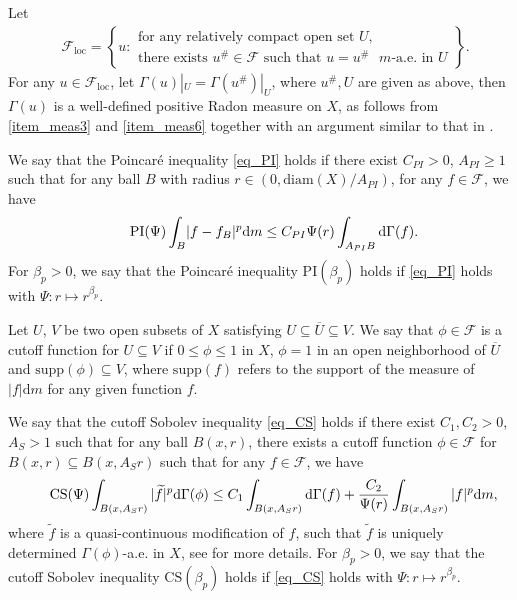 \documentclass[11pt,a4paper]{article}
\numberwithin{equation}{section}
\theoremstyle{plain}
\theoremstyle{definition}
\begin{document}
Let
\begin{align*}
&\mathcal{F}_{\mathrm{loc}}=\left\{u:
\begin{array}{l}
\text{for any relatively compact open set }U,\\
\text{there exists }u^\#\in\mathcal{F}\text{ such that }u=u^\#\text{ }m\text{-a.e. in }U
\end{array}
\right\}.
\end{align*}
For any $u\in \mathcal{F}_{\mathrm{loc}}$, let $\Gamma(u)|_U=\Gamma(u^\#)|_U$, where $u^\#, U$ are given as above, then $\Gamma(u)$ is a well-defined positive Radon measure on $X$, as follows from \ref{item_meas3} and \ref{item_meas6} together with an argument similar to that in \cite[Corollary 3.2.1]{FOT11}.

We say that the Poincar\'e inequality \ref{eq_PI} holds if there exist $C_{PI}>0$, $A_{PI}\ge1$ such that for any ball $B$ with radius $r\in(0,\mathrm{diam}(X)/A_{PI})$, for any $f\in\mathcal{F}$, we have
\begin{equation*}\label{eq_PI}\tag*{$\text{PI}(\Psi)$}
\int_B\lvert f-f_B\rvert^p\mathrm{d} m\le C_{PI}\Psi(r)\int_{A_{PI}B}\mathrm{d}\Gamma(f).
\end{equation*}
For $\beta_p>0$, we say that the Poincar\'e inequality \hypertarget{eq_PIbeta}{$\text{PI}(\beta_p)$} holds if \ref{eq_PI} holds with $\Psi:r\mapsto r^{\beta_p}$.

Let $U$, $V$ be two open subsets of $X$ satisfying $U\subseteq\overline{U}\subseteq V$. We say that $\phi\in\mathcal{F}$ is a cutoff function for $U\subseteq V$ if $0\le\phi\le1$ in $X$, $\phi=1$ in an open neighborhood of $\overline{U}$ and $\mathrm{supp}(\phi)\subseteq V$, where $\mathrm{supp}(f)$ refers to the support of the measure of $|f|\mathrm{d} m$ for any given function $f$.

We say that the cutoff Sobolev inequality \ref{eq_CS} holds if there exist $C_{1}, C_{2}>0$, $A_{S}>1$ such that for any ball $B(x,r)$, there exists a cutoff function $\phi\in\mathcal{F}$ for $B(x,r)\subseteq B(x,A_Sr)$ such that for any $f\in\mathcal{F}$, we have
\begin{equation*}\label{eq_CS}\tag*{$\text{CS}(\Psi)$}
\int_{B(x,A_{S}r)}|\widetilde{f}|^p \mathrm{d}\Gamma(\phi)\le C_{1}\int_{B(x,A_{S}r)}\mathrm{d}\Gamma(f)+\frac{C_{2}}{\Psi(r)}\int_{B(x,A_{S}r)}|f|^p\mathrm{d} m,
\end{equation*}
where $\widetilde{f}$ is a quasi-continuous modification of $f$, such that $\widetilde{f}$ is uniquely determined $\Gamma(\phi)$-a.e. in $X$, see \cite[Section 8]{Yan25a} for more details. For $\beta_p>0$, we say that the cutoff Sobolev inequality \hypertarget{eq_CSbeta}{$\text{CS}(\beta_p)$} holds if \ref{eq_CS} holds with $\Psi:r\mapsto r^{\beta_p}$.
\end{document}
